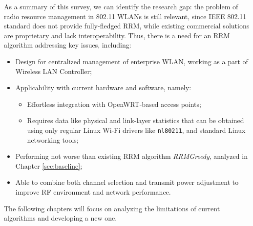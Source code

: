 As a summary of this survey, we can identify the research gap: the problem of radio resource management in 802.11 WLANs is still relevant, since IEEE 802.11 standard does not provide fully-fledged RRM, while existing commercial solutions are proprietary and lack interoperability. Thus, there is a need for an RRM algorithm addressing key issues, including:
\begin{itemize}
    \item Design for centralized management of enterprise WLAN, working as a part of Wireless LAN Controller;
    \item Applicability with current hardware and software, namely:
    \begin{itemize}
        \item Effortless integration with OpenWRT-based access points;
        \item Requires data like physical and link-layer statistics that can be obtained using only regular Linux Wi-Fi drivers like \texttt{nl80211}, and standard Linux networking tools;
    \end{itemize}
    \item Performing not worse than existing RRM algorithm \textit{RRMGreedy}, analyzed in Chapter \ref{sec:baseline};
    \item Able to combine both channel selection and transmit power adjustment to improve RF environment and network performance.
\end{itemize}

The following chapters will focus on analyzing the limitations of current algorithms and developing a new one.